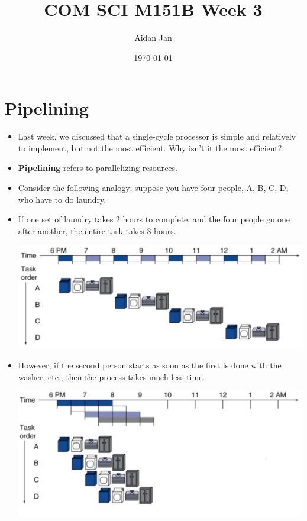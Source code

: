 \documentclass[10pt]{article}
\title{COM SCI M151B Week 3}
\author{Aidan Jan}
\date{\today}
\begin{document}
\maketitle

\section*{Pipelining}
\begin{itemize}
    \item Last week, we discussed that a single-cycle processor is simple and relatively to implement, but not the most efficient.  Why isn't it the most efficient?
    \item \textbf{Pipelining} refers to parallelizing resources.
    \item Consider the following analogy: suppose you have four people, A, B, C, D, who have to do laundry.
    \item If one set of laundry takes 2 hours to complete, and the four people go one after another, the entire task takes 8 hours.
    \begin{center}
        \includegraphics*[scale=0.65]{W3_1.png}
    \end{center}
    \item However, if the second person starts as soon as the first is done with the washer, etc., then the process takes much less time.
    \begin{center}
        \includegraphics*[scale=0.65]{W3_2.png}

\end{center}
\end{itemize}
\end{document}
